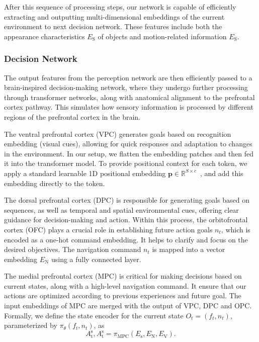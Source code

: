%
After this sequence of processing steps, our network is capable of efficiently extracting and outputting multi-dimensional embeddings of the current environment to next decision network. 
These features include both the appearance characteristics $ E_\text{S} $ of objects and motion-related information $ E_\text{S} $.



\subsubsection{Decision Network}
The output features from the perception network are then efficiently passed to a brain-inspired decision-making network, where they undergo further processing through transformer networks, along with anatomical alignment to the prefrontal cortex pathway. 
This simulates how sensory information is processed by different regions of the prefrontal cortex in the brain.
%


The ventral prefrontal cortex (VPC) generates goals based on recognition embedding (visual cues), allowing for quick responses and adaptation to changes in the environment.
%
In our setup, we flatten the embedding patches and then fed it into the transformer model.
To provide positional context for each token, we apply a standard learnable 1D positional embedding $\mathbf{p}\in \mathbb{R}^{S\times c}$~\cite{Alexey:2021}, and add this embedding directly to the token.


The dorsal prefrontal cortex (DPC) is responsible for generating goals based on sequences, as well as temporal and spatial environmental cues, offering clear guidance for decision-making and action.
Within this process, the orbitofrontal cortex (OFC) plays a crucial role in establishing future action goals $n_t$, which is encoded as a one-hot command embedding.
It helps to clarify and focus on the desired objectives. 
The navigation command $n_t$ is mapped into a vector embedding $E_\text{N}$ using a fully connected layer.



The medial prefrontal cortex (MPC) is critical for making decisions based on current states, along with a high-level navigation command.
It ensure that our actions are optimized according to previous experiences and future goal.
The input embeddings of MPC are merged with the output of VPC, DPC and OPC.
Formally, we define the state encoder for the current state $O_t=(f_t, n_t)$, parameterized by $ \pi_{\theta}(f_t, n_t) $, as
\begin{equation}\label{eq:encoder}
	A_\text{t}^\text{s}, A_\text{t}^\text{s} = \pi_\text{MPC}(E_\text{s}, E_\text{N}, E_\text{V}).
\end{equation}


